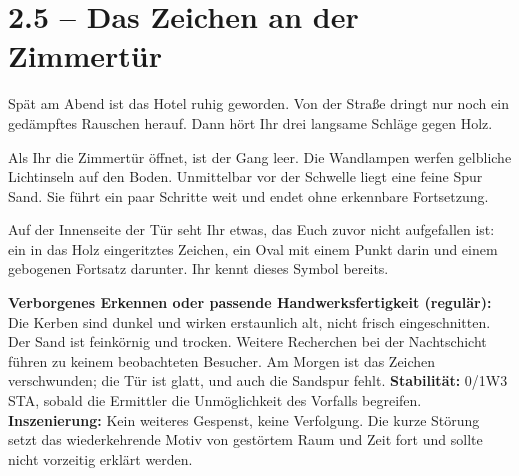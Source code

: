 \section{2.5 -- Das Zeichen an der Zimmertür}
\begin{vorlesetextalle}
Spät am Abend ist das Hotel ruhig geworden. Von der Stra\ss{}e dringt nur noch ein gedämpftes Rauschen herauf. Dann hört Ihr drei langsame Schläge gegen Holz.

Als Ihr die Zimmertür öffnet, ist der Gang leer. Die Wandlampen werfen gelbliche Lichtinseln auf den Boden. Unmittelbar vor der Schwelle liegt eine feine Spur Sand. Sie führt ein paar Schritte weit und endet ohne erkennbare Fortsetzung.

Auf der Innenseite der Tür seht Ihr etwas, das Euch zuvor nicht aufgefallen ist: ein in das Holz eingeritztes Zeichen, ein Oval mit einem Punkt darin und einem gebogenen Fortsatz darunter. Ihr kennt dieses Symbol bereits.
\end{vorlesetextalle}
\begin{meisterinfo}
\textbf{Verborgenes Erkennen oder passende Handwerksfertigkeit (regulär):} Die Kerben sind dunkel und wirken erstaunlich alt, nicht frisch eingeschnitten. Der Sand ist feinkörnig und trocken. Weitere Recherchen bei der Nachtschicht führen zu keinem beobachteten Besucher. Am Morgen ist das Zeichen verschwunden; die Tür ist glatt, und auch die Sandspur fehlt. \textbf{Stabilität:} 0/1W3 STA, sobald die Ermittler die Unmöglichkeit des Vorfalls begreifen. \textbf{Inszenierung:} Kein weiteres Gespenst, keine Verfolgung. Die kurze Störung setzt das wiederkehrende Motiv von gestörtem Raum und Zeit fort und sollte nicht vorzeitig erklärt werden.
\end{meisterinfo}

